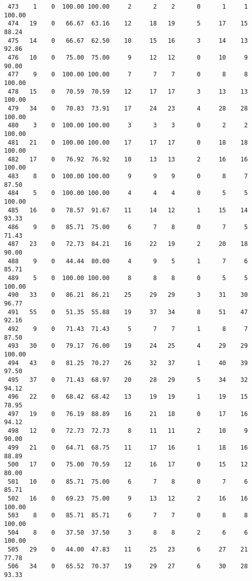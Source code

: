 \begin{verbatim}
 473    1    0  100.00 100.00     2      2    2      0      1     1   100.00
 474   19    0   66.67  63.16    12     18   19      5     17    15    88.24
 475   14    0   66.67  62.50    10     15   16      3     14    13    92.86
 476   10    0   75.00  75.00     9     12   12      0     10     9    90.00
 477    9    0  100.00 100.00     7      7    7      0      8     8   100.00
 478   15    0   70.59  70.59    12     17   17      3     13    13   100.00
 479   34    0   70.83  73.91    17     24   23      4     28    28   100.00
 480    3    0  100.00 100.00     3      3    3      0      2     2   100.00
 481   21    0  100.00 100.00    17     17   17      0     18    18   100.00
 482   17    0   76.92  76.92    10     13   13      2     16    16   100.00
 483    8    0  100.00 100.00     9      9    9      0      8     7    87.50
 484    5    0  100.00 100.00     4      4    4      0      5     5   100.00
 485   16    0   78.57  91.67    11     14   12      1     15    14    93.33
 486    9    0   85.71  75.00     6      7    8      0      7     5    71.43
 487   23    0   72.73  84.21    16     22   19      2     20    18    90.00
 488    9    0   44.44  80.00     4      9    5      1      7     6    85.71
 489    5    0  100.00 100.00     8      8    8      0      5     5   100.00
 490   33    0   86.21  86.21    25     29   29      3     31    30    96.77
 491   55    0   51.35  55.88    19     37   34      8     51    47    92.16
 492    9    0   71.43  71.43     5      7    7      1      8     7    87.50
 493   30    0   79.17  76.00    19     24   25      4     29    29   100.00
 494   43    0   81.25  70.27    26     32   37      1     40    39    97.50
 495   37    0   71.43  68.97    20     28   29      5     34    32    94.12
 496   22    0   68.42  68.42    13     19   19      1     19    15    78.95
 497   19    0   76.19  88.89    16     21   18      0     17    16    94.12
 498   12    0   72.73  72.73     8     11   11      2     10     9    90.00
 499   21    0   64.71  68.75    11     17   16      1     18    16    88.89
 500   17    0   75.00  70.59    12     16   17      0     15    12    80.00
 501   10    0   85.71  75.00     6      7    8      0      7     6    85.71
 502   16    0   69.23  75.00     9     13   12      2     16    16   100.00
 503    8    0   85.71  85.71     6      7    7      0      8     8   100.00
 504    8    0   37.50  37.50     3      8    8      2      6     6   100.00
 505   29    0   44.00  47.83    11     25   23      6     27    21    77.78
 506   34    0   65.52  70.37    19     29   27      6     30    28    93.33

\end{verbatim}
